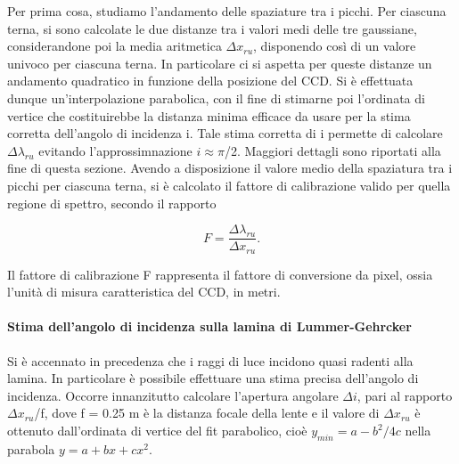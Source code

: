 \documentclass{article}
\begin{document}
	Per prima cosa, studiamo l'andamento delle spaziature tra i picchi. 
	Per ciascuna terna, si sono calcolate le due distanze tra i valori medi
	delle tre gaussiane, considerandone poi la media aritmetica $\Delta x_{ru}$,
	disponendo così di un valore univoco per ciascuna terna.
	In particolare ci si aspetta per queste distanze un andamento quadratico 
	in funzione della posizione del CCD. Si è effettuata dunque un'interpolazione
	parabolica, con il fine di stimarne poi l'ordinata di vertice che 
	costituirebbe la distanza minima efficace da usare per la stima
	corretta dell'angolo di incidenza i. Tale stima corretta di i
	permette di calcolare $\Delta\lambda_{ru}$ evitando l'approssimnazione $i \approx \pi$/2. 
	Maggiori dettagli sono riportati alla fine di questa sezione.
	Avendo a disposizione il valore medio della spaziatura tra i picchi per ciascuna
	terna, si è calcolato il fattore di calibrazione valido per quella regione
	di spettro, secondo il rapporto

	\begin{equation}
		F = \frac{\Delta\lambda_{ru}}{\Delta x_{ru}}.
	\end{equation}

	Il fattore di calibrazione F rappresenta il fattore di conversione da pixel, 
	ossia l'unità di misura caratteristica del CCD, in metri.




	\paragraph{Stima dell'angolo di incidenza sulla lamina di Lummer-Gehrcker}
	Si è accennato in precedenza che i raggi di luce incidono quasi radenti
	alla lamina. In particolare è possibile effettuare una stima precisa dell'angolo
	di incidenza. Occorre innanzitutto calcolare l'apertura angolare
	$\Delta i$, pari al rapporto $\Delta x_{ru}$/f, dove f = 0.25 m è la distanza
	focale della lente e il valore di $\Delta x_{ru}$ è ottenuto dall'ordinata 
	di vertice del fit parabolico, cioè $y_{min} = a - b^2 / 4c$ nella 
	parabola $y = a +bx + cx^2$.
\end{document}

